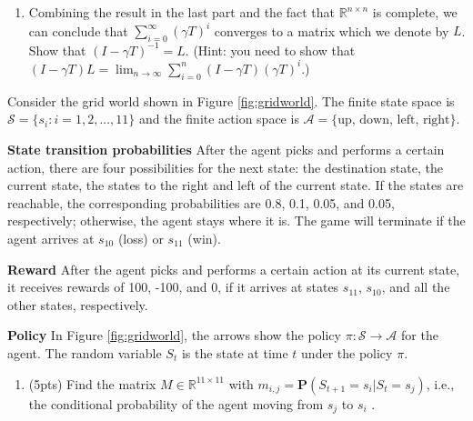 \documentclass[11pt,letter,notitlepage]{article}
\begin{document}
\begin{exercise}
\begin{enumerate}
\begin{enumerate}
                \item Combining the result in the last part and the fact that $\mathbb{R}^{n\times n}$ is complete, we can conclude that $\sum_{i=0}^\infty(\gamma T)^i$ converges to a matrix which we denote by $L$. Show that $(I-\gamma T)^{-1}=L$. (Hint: you need to show that $(I-\gamma T)L=\lim_{n\rightarrow\infty}\sum_{i=0}^{n}(I-\gamma T)(\gamma T)^i$.)
            \end{enumerate}
    \end{enumerate}
\end{exercise}


\newpage
\begin{exercise}\label{exercise:GridWorld}

Consider the grid world shown in Figure \ref{fig:gridworld}. The finite state space is $\mathcal{S} = \{s_i:i=1,2,\dots, 11\}$ and the finite action space is $\mathcal{A} = \{\mbox{up, down, left, right}\}$.

\noindent\textbf{State transition probabilities} After the agent picks and performs a certain action, there are four 
possibilities for the next state: the destination state, the current state, the states to the right and left of the current state. If the states are reachable, the corresponding probabilities are 0.8, 0.1, 0.05, and 0.05, respectively; otherwise, the agent stays where it is. The game will terminate if the agent arrives at $s_{10}$ (loss) or $s_{11}$ (win). 

\noindent\textbf{Reward} After the agent picks and performs a certain action at its current state, it receives rewards of 100, -100, and 0, if it arrives at states $s_{11}$, $s_{10}$, and all the other states, respectively.

\noindent\textbf{Policy} In Figure \ref{fig:gridworld}, the arrows show the policy $\pi:\mathcal{S}\rightarrow\mathcal{A}$ for the agent. The random variable $S_t$ is the state at time $t$ under the policy $\pi$. 

\begin{enumerate}
	\item (5pts) Find the matrix $M\in\mathbb{R}^{11\times 11}$ with $m_{i,j}=\mathbf{P}(S_{t+1}=s_i|S_t=s_j)$, i.e., the conditional probability of the agent moving from $s_j$ to $s_i$ .
	

\end{enumerate}
\end{exercise}
\end{document}
